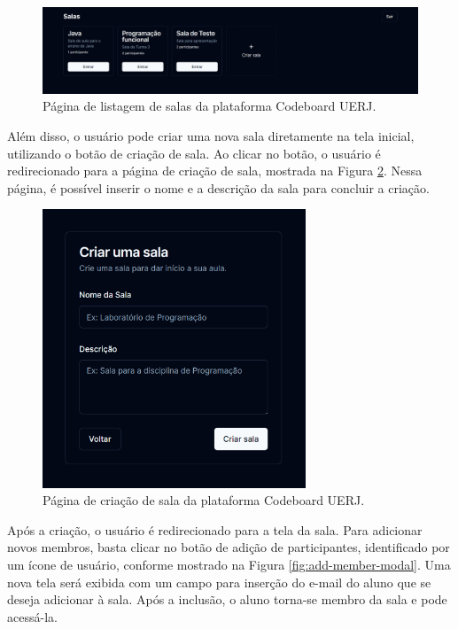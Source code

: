 \begin{figure}[H]
    \centering
    \includegraphics[width=1\textwidth]{assets/codeboard/rooms-page.png}
    \caption{Página de listagem de salas da plataforma Codeboard UERJ.}
    \label{fig:rooms-page}
\end{figure}


Além disso, o usuário pode criar uma nova sala diretamente na tela inicial, utilizando o botão de criação de sala. Ao clicar no botão, o usuário é redirecionado para a página de criação de sala, mostrada na Figura \ref{fig:create-room-page}. Nessa página, é possível inserir o nome e a descrição da sala para concluir a criação.

\begin{figure}[H]
    \centering
    \includegraphics[width=0.7\textwidth]{assets/codeboard/create-room-page.png}
    \caption{Página de criação de sala da plataforma Codeboard UERJ.}
    \label{fig:create-room-page}
\end{figure}

Após a criação, o usuário é redirecionado para a tela da sala. Para adicionar novos membros, basta clicar no botão de adição de participantes, identificado por um ícone de usuário, conforme mostrado na Figura \ref{fig:add-member-modal}. Uma nova tela será exibida com um campo para inserção do e-mail do aluno que se deseja adicionar à sala. Após a inclusão, o aluno torna-se membro da sala e pode acessá-la.

